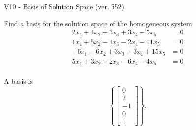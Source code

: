 \begin{exercise}
  \begin{exerciseTitle}V10 - Basis of Solution Space (ver. 552)\end{exerciseTitle}
  \begin{exerciseStatement}
    Find a basis for the solution space of the homogeneous system 
\begin{align*}
 2 x_ 1 + 4 x_ 2 + 3 x_ 3 + 3 x_ 4 -5 x_ 5 &= 0  \\ 
  1 x_ 1 + 5 x_ 2 -1 x_ 3 -2 x_ 4 -11 x_ 5 &= 0  \\ 
  -6 x_ 1 -6 x_ 2 + 3 x_ 3 + 3 x_ 4 + 15 x_ 5 &= 0  \\ 
  5 x_ 1 + 3 x_ 2 + 2 x_ 3 -6 x_ 4 -4 x_ 5 &= 0  \\ 
 \end{align*}


 
  \end{exerciseStatement}

  \begin{exerciseAnswer}
   A basis is   
\[\left\{\left[\begin{array}{c}
0 \\
2 \\
-1 \\
0 \\
1
\end{array}\right]\right\}.\]

  


  \end{exerciseAnswer}
\end{exercise}
